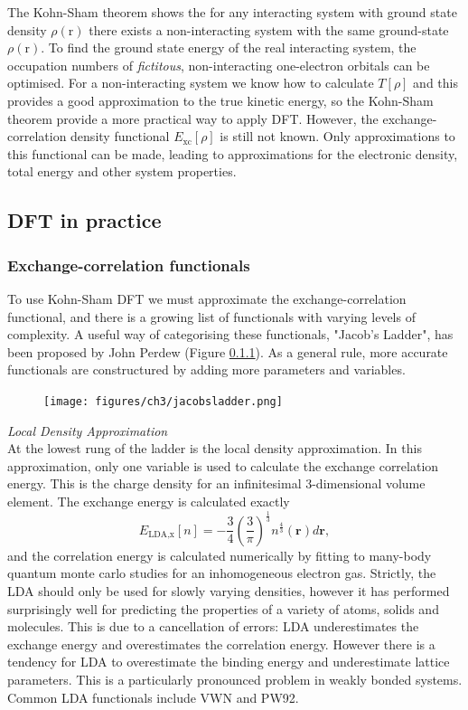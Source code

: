 The Kohn-Sham theorem shows the for any interacting system with ground state density $\rho(\textrm{r})$ there exists a non-interacting system with the same ground-state $\rho(\textrm{r})$. To find the ground state energy of the real interacting system, the occupation numbers of \textit{fictitous}, non-interacting one-electron orbitals can be optimised. For a non-interacting system we know how to calculate $T\left[\rho\right]$ and this provides a good approximation to the true kinetic energy, so the Kohn-Sham theorem provide a more practical way to apply DFT. However, the exchange-correlation density functional $E_{\textrm{xc}}\left[\rho\right]$ is still not known. Only approximations to this functional can be made, leading to approximations for the electronic density, total energy and other system properties.


\subsection{DFT in practice}

\subsubsection{Exchange-correlation functionals}
To use Kohn-Sham DFT we must approximate the exchange-correlation functional, and there is a growing list of functionals with varying levels of complexity. A useful way of categorising these functionals, "Jacob's Ladder", has been proposed by John Perdew (Figure \ref{}). As a general rule, more accurate functionals are constructured by adding more parameters and variables.

\begin{figure}[h]
\centering
  \texttt{[image: figures/ch3/jacobsladder.png]}
  \caption[Jacob's ladder of exchange-correlation functionals]{}
  \label{decouple}
\end{figure}

\textit{Local Density Approximation} \\
At the lowest rung of the ladder is the local density approximation. In this approximation, only one variable is used to calculate the exchange correlation energy. This is the charge density for an infinitesimal 3-dimensional volume element. The exchange energy is calculated exactly
$$
E_{\textrm{LDA,x}}\left[n\right] = −\frac{3}{4}\left(\frac{3}{\pi}\right)^{\frac{1}{3}}n^{\frac{4}{3}}\left(\textbf{r}\right)d\textbf{r},
$$
and the correlation energy is calculated numerically by fitting to many-body quantum monte carlo studies for an inhomogeneous electron gas.%
Strictly, the LDA should only be used for slowly varying densities, however it has performed surprisingly well for predicting the properties of a variety of atoms, solids and molecules. This is due to a cancellation of errors: LDA underestimates the exchange energy and overestimates the correlation energy. However there is a tendency for LDA to overestimate the binding energy and underestimate lattice parameters. This is a particularly pronounced problem in weakly bonded systems. Common LDA functionals include VWN and PW92.

